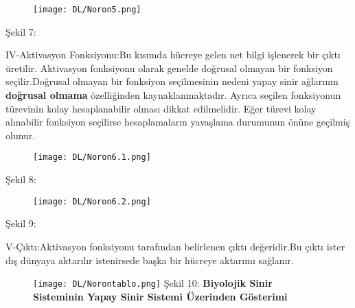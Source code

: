 \documentclass{beamer}                                                                                          %
\begin{document}
    
    \begin{frame}{}
	    \begin{figure}
	        \centering
	        \texttt{[image: DL/Noron5.png]}
	    \end{figure}
	    \centering
	    \color{myred1}Şekil 7:\color{black}
    \end{frame}
    
	
	\begin{frame}
		    \justifying
		    \color{myred1}
		    IV-Aktivasyon Fonksiyonu:\color{black}Bu kısımda hücreye gelen net bilgi işlenerek bir çıktı üretilir. Aktivasyon fonksiyonu olarak genelde doğrusal olmayan bir fonksiyon seçilir.Doğrusal olmayan bir fonksiyon seçilmesinin nedeni yapay sinir ağlarının \textbf{doğrusal olmama} özelliğinden kaynaklanmaktadır. Ayrıca seçilen fonksiyonun türevinin kolay hesaplanabilir olması dikkat edilmelidir. Eğer türevi kolay alınabilir fonksiyon seçilirse hesaplamaların yavaşlama durumunun önüne geçilmiş olunur.
    \end{frame}
    
	
	\begin{frame}
	    \begin{figure}
	        \centering
	        \texttt{[image: DL/Noron6.1.png]}
	    \end{figure}
	    \centering
	    \color{myred1}Şekil 8:\color{black}
    \end{frame}
    

	\begin{frame}
	    \begin{figure}
	        \centering
	        \texttt{[image: DL/Noron6.2.png]}
	    \end{figure}
	    \centering
	    \color{myred1}Şekil 9:\color{black}
    \end{frame}
    

	\begin{frame}
		\justifying
		\color{myred1}
		V-Çıktı:\color{black}Aktivasyon fonksiyonu tarafından belirlenen çıktı değeridir.Bu çıktı ister dış dünyaya aktarılır istenirsede başka bir hücreye aktarımı sağlanır.\newline
            \begin{figure}
    	        \centering
    	        \texttt{[image: DL/Norontablo.png]}
    	        \centering
	            \color{myred1}Şekil 10:\color{black}\textbf{ Biyolojik Sinir Sisteminin Yapay Sinir Sistemi Üzerinden 
    	        Gösterimi}
	        \end{figure}
    \end{frame}
    
\end{document}
